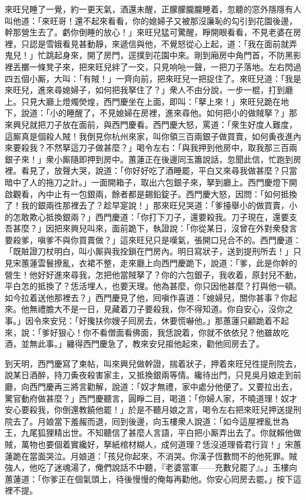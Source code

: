 來旺兒睡了一覺，約一更天氣，酒還未醒，正朦朦朧朧睡着，忽聽的窓外隱隱有人叫他道：「來旺哥！還不起來看看，你的媳婦子又被那沒廉恥的勾引到花園後邊，幹那營生去了。虧你倒睡的放心！」{}來旺兒猛可驚醒，睜開眼看看，不見老婆在房裡，只認是雪娥看見甚動靜，來遞信與他，不覺怒從心上起，道：「我在面前就弄鬼兒！」忙跳起身來，開了房門，逕撲到花園中來。剛到廂房中角門首，不防黑影裡丟擲一條凳子來，把來旺兒絆了一交，只見响喨一聲，一把刀子落地。左右閃過四五個小厮，大叫：「有賊！」一齊向前，把來旺兒一把捉住了。來旺兒道：「我是來旺兒，進來尋媳婦子，如何把我拏住了？」衆人不由分說，一步一棍，打到廳上。只見大廳上燈燭熒煌，西門慶坐在上面，即叫：「拏上來！」來旺兒跪在地下，說道：「小的睡醒了，不見媳婦在房裡，進來尋他。如何把小的做賊拏？」那來興兒就把刀子放在面前，與西門慶看。西門慶大怒，罵道：「衆生好度人難度，這厮真是個殺人賊！我倒見你杭州來家，叫你領三百兩銀子做買賣，如何夤夜進內來要殺我？不然拏這刀子做甚麼？」喝令左右：「與我押到他房中，取我那三百兩銀子來！」衆小厮隨即押到房中。蕙蓮正在後邊同玉簫說話，忽聞此信，忙跑到房裡。看見了，放聲大哭，說道：「你好好吃了酒睡罷，平白又來尋我做甚麼？只當暗中了人的拖刀之計。」一面開箱子，取出六包銀子來，拏到廳上。西門慶燈下開啟觀看，內中止有一包銀兩，餘者都是錫鉛錠子。西門慶大怒，因問：「如何抵換了！我的銀兩徃那裡去了？趁早寔說！」那來旺兒哭道：「爹擡舉小的做買賣，小的怎敢欺心抵換銀兩？」西門慶道：「你打下刀子，還要殺我。刀子現在，還要支吾甚麼？」因把來興兒叫來，面前跪下，執證說：「你從某日，沒曾在外對衆發言要殺爹，嗔爹不與你買賣做？」這來旺兒只是嘆氣，張開口兒合不的。西門慶道：「既賍證刀杖明白，叫小厮與我拴鎖在門房內。明日寫狀子，送到提刑所去！」只見宋蕙蓮雲鬟撩亂，衣裙不整，走來廳上向西門慶跪下，說道：「爹，此是你幹的營生！他好好進來尋我，怎把他當賊拏了？你的六包銀子，我收着，原封兒不動，平白怎的抵換了？恁活埋人，也要天理。他為甚麼，你只因他甚麼？{}打與他一頓。如今拉着送他那裡去？」西門慶見了他，囘嗔作喜道：「媳婦兒，關你甚事？你起來。他無禮膽大不是一日，見藏着刀子要殺我，你不得知道。你自安心，沒你之事。」因令來安兒：「好攙扶你嫂子囘房去，休要慌嚇他。」{}那蕙蓮只顧跪着不起來，說：「爹好狠心！你不看僧面看佛面，我恁說着，你就不依依兒？{}他雖故吃酒，並無此事。」纏得西門慶急了，教來安兒搊他起來，勸他囘房去了。

到天明，西門慶寫了柬帖，叫來興兒做幹證，揣着狀子，押着來旺兒徃提刑院去，說某日酒醉，持刀夤夜殺害家主，又抵換銀兩等情。纔待出門，只見吳月娘走到前廳，向西門慶再三將言勸解，說道：「奴才無禮，家中處分他便了。又要拉出去，驚官動府做甚麼？」西門慶聽言，圓睜二目，喝道：「你婦人家，不曉道理！奴才安心要殺我，你倒還教饒他罷！」{}於是不聽月娘之言，喝令左右把來旺兒押送提刑院去了。月娘當下羞赧而退，囘到後邊，向玉樓衆人說道：「如今這屋裡亂世為王，九尾狐狸精出世。不知聽信了甚麼人言語，平白把小厮弄出去了。你就賴他做賊，萬物也要個着實纔好，拏紙棺材糊人，成何道理？恁沒道理昏君行貨！」宋蕙蓮跪在當面哭泣。月娘道：「孩兒你起來，不消哭。你漢子恆數問不的他死罪。賊強人，他吃了迷魂湯了，俺們說話不中聽，『老婆當軍——充數兒罷了』。」玉樓向蕙蓮道：「你爹正在個氣頭上，待後慢慢的俺每再勸他。你安心囘房去罷。」按下這裡不提。

